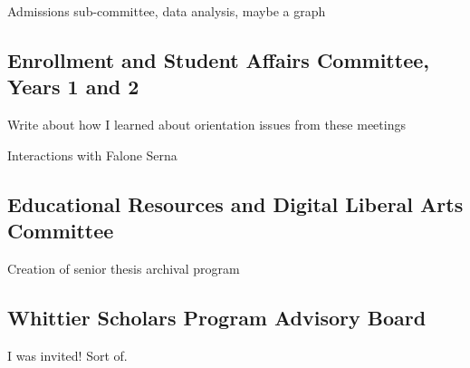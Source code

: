 \documentclass[../../../main.tex]{subfiles}
\begin{document}
Admissions sub-committee, data analysis, maybe a graph

\subsection{Enrollment and Student Affairs Committee, Years 1 and 2}

Write about how I learned about orientation issues from these meetings

Interactions with Falone Serna

\subsection{Educational Resources and Digital Liberal Arts Committee}

Creation of senior thesis archival program

\subsection{Whittier Scholars Program Advisory Board}

I was invited!  Sort of.
\end{document}
